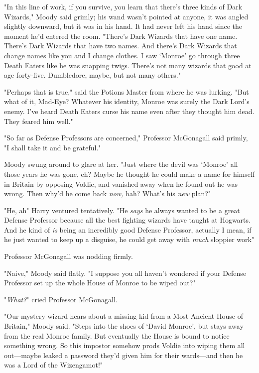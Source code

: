 "In this line of work, if you survive, you learn that there's three kinds of
Dark Wizards," Moody said grimly; his wand wasn't pointed at anyone, it was
angled slightly downward, but it was in his hand. It had never left his hand
since the moment he'd entered the room. "There's Dark Wizards that have one
name. There's Dark Wizards that have two names. And there's Dark Wizards that
change names like you and I change clothes. I saw `Monroe' go through three
Death Eaters like he was snapping twigs. There's not many wizards that good at
age forty-five. Dumbledore, maybe, but not many others."

"Perhaps that is true," said the Potions Master from where he was lurking. "But
what of it, Mad-Eye? Whatever his identity, Monroe was surely the Dark Lord's
enemy. I've heard Death Eaters curse his name even after they thought him dead.
They feared him well."

"So far as Defense Professors are concerned," Professor McGonagall said primly,
"I shall take it and be grateful."

Moody swung around to glare at her. "Just where the devil was `Monroe' all
those years he was gone, eh? Maybe he thought he could make a name for himself
in Britain by opposing Voldie, and vanished away when he found out he was
wrong. Then why'd he come back \emph{now,} hah? What's his \emph{new} plan?"

"He, ah{\el}" Harry ventured tentatively. "He \emph{says} he always wanted
to be a great Defense Professor because all the best fighting wizards have
taught at Hogwarts. And he kind of \emph{is} being an incredibly good Defense
Professor, actually{\el} I mean, if he just wanted to keep up a disguise, he
could get away with \emph{much} sloppier work{\el}"

Professor McGonagall was nodding firmly.

"Naive," Moody said flatly. "I suppose you all haven't wondered if your Defense
Professor set up the whole House of Monroe to be wiped out?"

"\emph{What?}" cried Professor McGonagall.

"Our mystery wizard hears about a missing kid from a Most Ancient House of
Britain," Moody said. "Steps into the shoes of `David Monroe', but stays away
from the real Monroe family. But eventually the House is bound to notice
something wrong. So this impostor somehow prods Voldie into wiping them all
out—maybe leaked a password they'd given him for their wards—and then he
was a Lord of the Wizengamot!"

